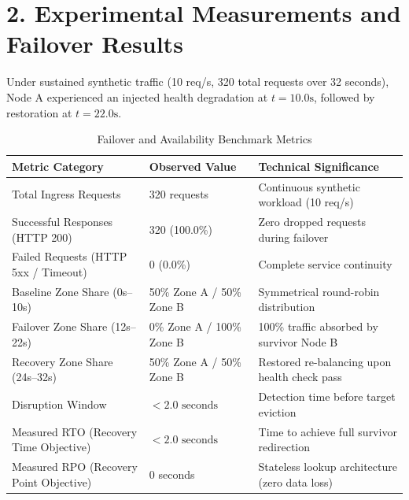 \documentclass[11pt,a4paper]{article}
\newcommand{\sectionline}[1]{\section*{\color{navy}#1}}
\begin{document}
\newpage
\sectionline{2. Experimental Measurements and Failover Results}
Under sustained synthetic traffic (10 req/s, 320 total requests over 32 seconds), Node A experienced an injected health degradation at $t=10.0\text{s}$, followed by restoration at $t=22.0\text{s}$.

\begin{table}[h]
\centering
\small
\begin{tabularx}{\textwidth}{@{}lYY@{}}\toprule
\textbf{Metric Category} & \textbf{Observed Value} & \textbf{Technical Significance}\\\midrule
Total Ingress Requests & 320 requests & Continuous synthetic workload (10 req/s)\\
Successful Responses (HTTP 200) & 320 (100.0\%) & Zero dropped requests during failover\\
Failed Requests (HTTP 5xx / Timeout) & 0 (0.0\%) & Complete service continuity\\
Baseline Zone Share (0s--10s) & 50\% Zone A / 50\% Zone B & Symmetrical round-robin distribution\\
Failover Zone Share (12s--22s) & 0\% Zone A / 100\% Zone B & 100\% traffic absorbed by survivor Node B\\
Recovery Zone Share (24s--32s) & 50\% Zone A / 50\% Zone B & Restored re-balancing upon health check pass\\
Disruption Window & $< 2.0\text{ seconds}$ & Detection time before target eviction\\
Measured RTO (Recovery Time Objective) & $< 2.0\text{ seconds}$ & Time to achieve full survivor redirection\\
Measured RPO (Recovery Point Objective) & 0 seconds & Stateless lookup architecture (zero data loss)\\\bottomrule
\end{tabularx}
\caption{Failover and Availability Benchmark Metrics}
\end{table}
\end{document}
